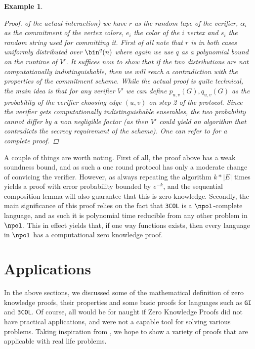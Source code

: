 \documentclass{article}
\newtheorem{example}{Example}
\begin{document}
\begin{example}
\begin{proof}
        of the actual interaction)
        we have $r$ as the random tape of the verifier, $\alpha_i$ as the commitment of the vertex colors, $e_i$ the color of the $i$ vertex and $s_i$ the
        random string used for committing it. First of all note that $r$ is in both cases uniformly distributed over $\bin^q(n)$ where again we
        use $q$ as a polynomial bound on the runtime of $V'$. It suffices now to show that if the two distributions are
        not computationally indistinguishable, then we will reach a contradiction with the properties of the commitment scheme.
        While the actual proof is quite technical, the main idea is that for any verifier $V'$ we can
        define $p_{u, v}(G), q_{u,v}(G)$ as the probability of the verifier choosing edge $(u,v)$ on step 2 of the protocol.
        Since the verifier gets computationally indistinguishable ensembles, the two probability cannot differ by a non negligible factor
        (as then $V'$ could yield an algorithm that contradicts the secrecy requirement of the scheme). One can refer to \cite{goldreichFoundationsCryptographyVol2007}
        for a complete proof.

    \end{proof}
\end{example}

A couple of things are worth noting. First of all, the proof above has a weak soundness bound, and as such
a one round protocol has only a moderate change of convicing the verifier. However, as always repeating the
algorithm $k * |E|$ times yields a proof with error probability bounded by $e^{-k}$, and the sequential composition lemma will
also guarantee that this is zero knowledge. Secondly, the main significance of this proof relies on the fact that
\texttt{3COL} is a $\npol$-complete language, and as such it is polynomial time reducible from any other problem in $\npol$.
This in effect yields that, if one way functions exists, then every language in $\npol$ has a computational zero knowledge proof.

\section{Applications}
\label{applications}
In the above sections, we discussed some of the mathematical definition of zero knowledge proofs, their properties and some basic
proofs for languages such as \texttt{GI} and \texttt{3COL}. Of course, all would be for naught if Zero Knowledge Proofs
did not have practical applications, and were not a capable tool for solving various problems.
Taking inspiration from \cite{moraisSurveyZeroKnowledge2019}, we hope to show a variety of proofs that
are applicable with real life problems.
\end{document}
